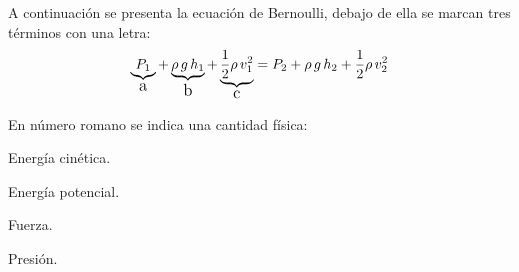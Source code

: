 \documentclass[12pt]{exam}
\begin{document}
\begin{questions}
    \question A continuación se presenta la ecuación de Bernoulli, debajo de ella se marcan tres términos con una letra:
    \begin{align*}
    \underbrace{P_{1}}_{\text{\large{a}}} + \underbrace{\rho \, g \, h_{1}}_{\text{\large{b}}} + \underbrace{\dfrac{1}{2} \rho \, v_{1}^{2}}_{\text{\large{c}}} = P_{2} + \rho \, g \, h_{2} + \dfrac{1}{2} \rho \, v_{2}^{2}
    \end{align*}
        
    \vspace{0.5em}
    En número romano se indica una cantidad física:
    
    \begin{inparaenum}[I)]
            \item Energía cinética. \quad \quad
            \item Energía potencial. \quad \quad
            \item Fuerza. \quad \quad
            \item Presión.
    \end{inparaenum}


\end{questions}
\end{document}
